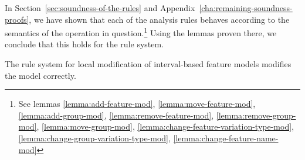 In Section~\vref{sec:soundness-of-the-rules} and Appendix~\ref{cha:remaining-soundness-proofs}, we have shown that each of the analysis rules behaves according to the semantics of the operation in question.\footnote{See lemmas \ref{lemma:add-feature-mod}, \ref{lemma:move-feature-mod}, \ref{lemma:add-group-mod}, \ref{lemma:remove-feature-mod}, \ref{lemma:remove-group-mod}, \ref{lemma:move-group-mod}, \ref{lemma:change-feature-variation-type-mod}, \ref{lemma:change-group-variation-type-mod}, \ref{lemma:change-feature-name-mod}} Using the lemmas proven there, we conclude that this holds for the rule system.
\\
\begin{theorem}
  The rule system for local modification of interval-based feature models modifies the model correctly.
\end{theorem}

